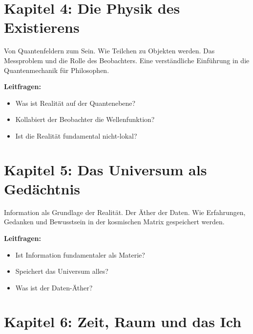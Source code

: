 \section*{Kapitel 4: Die Physik des Existierens}

Von Quantenfeldern zum Sein. Wie Teilchen zu Objekten werden. Das Messproblem und die Rolle des Beobachters. Eine verständliche Einführung in die Quantenmechanik für Philosophen.

\textbf{Leitfragen:}
\begin{itemize}
	\item Was ist Realität auf der Quantenebene?
	\item Kollabiert der Beobachter die Wellenfunktion?
	\item Ist die Realität fundamental nicht-lokal?
\end{itemize}

\section*{Kapitel 5: Das Universum als Gedächtnis}

Information als Grundlage der Realität. Der Äther der Daten. Wie Erfahrungen, Gedanken und Bewusstsein in der kosmischen Matrix gespeichert werden.

\textbf{Leitfragen:}
\begin{itemize}
	\item Ist Information fundamentaler als Materie?
	\item Speichert das Universum alles?
	\item Was ist der Daten-Äther?
\end{itemize}

\section*{Kapitel 6: Zeit, Raum und das Ich}

